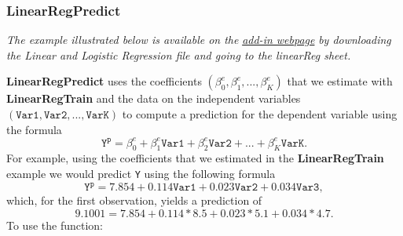 \documentclass[12pt]{article}
\begin{document}
\subsubsection{LinearRegPredict}

\textit{The example illustrated below is available on the}  \href{https://www8.gsb.columbia.edu/bizanalytics/excel-add-in/multiplatform#h-4}{ \textit{add-in webpage}}
 \textit{by downloading the Linear and Logistic Regression file and going to the linearReg sheet.}

\textbf{LinearRegPredict} uses the coefficients $(\beta_0^{e},\beta_1^{e},...,\beta_K^{e})$ that we estimate with \textbf{LinearRegTrain} and the data on the independent variables $(\texttt{Var1},\texttt{Var2},...,\texttt{VarK})$ to compute a prediction for the dependent variable using the formula
\[
\texttt{Y}^{\texttt{p}}=\beta_0^{e}+\beta_1^{e} \texttt{Var1}+\beta_2^{e} \texttt{Var2} +...+ \beta_K^{e} \texttt{VarK}.
\]
For example, using the coefficients that we estimated in the \textbf{LinearRegTrain} example we would predict \texttt{Y} using the following formula
\[
\texttt{Y}^{\texttt{p}}=7.854+0.114  \texttt{Var1}+0.023 \texttt{Var2}+ 0.034 \texttt{Var3},
\]
which, for the first observation, yields a prediction of
\[
9.1001=7.854+0.114*8.5+0.023*5.1+ 0.034*4.7.
\]
To use the function:
\end{document}
